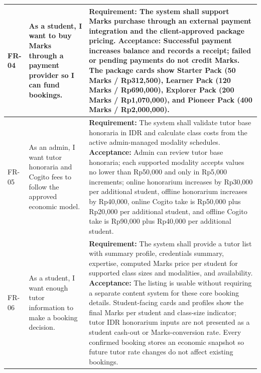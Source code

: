 \documentclass[11pt,a4paper]{article}
\begin{document}
\begin{longtable}{|L{1.5cm}|L{4.1cm}|L{9.0cm}|}
	FR-04           & As a student, I want to buy Marks through a payment provider so I can fund bookings.                                   & \textbf{Requirement:} The system shall support Marks purchase through an external payment integration and the client-approved package pricing. \newline \textbf{Acceptance:} Successful payment increases balance and records a receipt; failed or pending payments do not credit Marks. The package cards show Starter Pack (50 Marks / Rp312,500), Learner Pack (120 Marks / Rp690,000), Explorer Pack (200 Marks / Rp1,070,000), and Pioneer Pack (400 Marks / Rp2,000,000).                                                                                                                                                                                                                                                                                                                                                                 \\
	\hline
	FR-05           & As an admin, I want tutor honoraria and Cogito fees to follow the approved economic model.                                         & \textbf{Requirement:} The system shall validate tutor base honoraria in IDR and calculate class costs from the active admin-managed modality schedules. \newline \textbf{Acceptance:} Admin can review tutor base honoraria; each supported modality accepts values no lower than Rp50,000 and only in Rp5,000 increments; online honorarium increases by Rp30,000 per additional student, offline honorarium increases by Rp40,000, online Cogito take is Rp50,000 plus Rp20,000 per additional student, and offline Cogito take is Rp90,000 plus Rp40,000 per additional student.                                                                                                                                                                                                                                                                                                                                 \\
	\hline
	FR-06           & As a student, I want enough tutor information to make a booking decision.                                              & \textbf{Requirement:} The system shall provide a tutor list with summary profile, credentials summary, expertise, computed Marks price per student for supported class sizes and modalities, and availability. \newline \textbf{Acceptance:} The listing is usable without requiring a separate content system for these core booking details. Student-facing cards and profiles show the final Marks per student and class-size indicator; tutor IDR honorarium inputs are not presented as a student cash-out or Marks-conversion rate. Every confirmed booking stores an economic snapshot so future tutor rate changes do not affect existing bookings.                                                                                                                                                                                        \\

\end{longtable}
\end{document}
